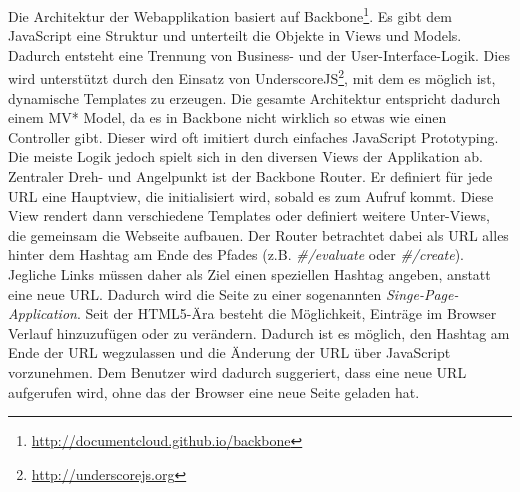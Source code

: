 Die Architektur der Webapplikation basiert auf Backbone\footnote{\url{http://documentcloud.github.io/backbone}}. Es gibt dem JavaScript eine Struktur und unterteilt die Objekte in Views und Models. Dadurch entsteht eine Trennung von Business- und der User-Interface-Logik. Dies wird unterstützt durch den Einsatz von UnderscoreJS\footnote{\url{http://underscorejs.org}}, mit dem es möglich ist, dynamische Templates zu erzeugen. Die gesamte Architektur entspricht dadurch einem MV* Model, da es in Backbone nicht wirklich so etwas wie einen Controller gibt. Dieser wird oft imitiert durch einfaches JavaScript Prototyping. Die meiste Logik jedoch spielt sich in den diversen Views der Applikation ab. Zentraler Dreh- und Angelpunkt ist der Backbone Router. Er definiert für jede URL eine Hauptview, die initialisiert wird, sobald es zum Aufruf kommt. Diese View rendert dann verschiedene Templates oder definiert weitere Unter-Views, die gemeinsam die Webseite aufbauen. Der Router betrachtet dabei als URL alles hinter dem Hashtag am Ende des Pfades (z.B. \textit{\#/evaluate} oder \textit{\#/create}). Jegliche Links müssen daher als Ziel einen speziellen Hashtag angeben, anstatt eine neue URL. Dadurch wird die Seite zu einer sogenannten \textit{Singe-Page-Application}. Seit der HTML5-Ära besteht die Möglichkeit, Einträge im Browser Verlauf hinzuzufügen oder zu verändern. Dadurch ist es möglich, den Hashtag am Ende der URL wegzulassen und die Änderung der URL über JavaScript vorzunehmen. Dem Benutzer wird dadurch suggeriert, dass eine neue URL aufgerufen wird, ohne das der Browser eine neue Seite geladen hat.\\

